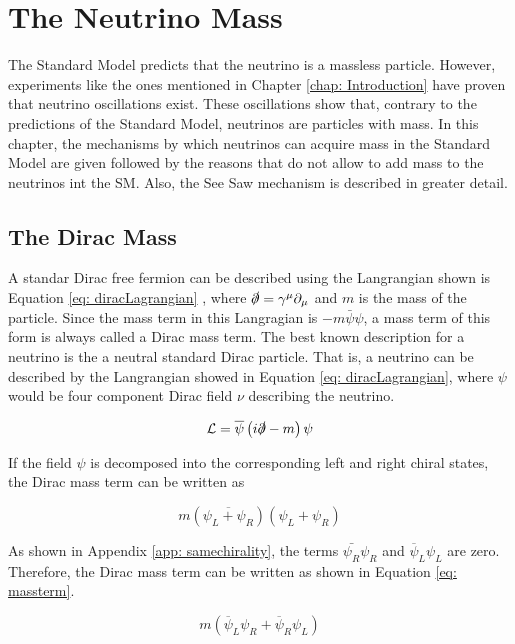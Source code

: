 \chapter{The Neutrino Mass}

The Standard Model predicts that the neutrino is a massless particle. However, experiments like the ones mentioned in Chapter \ref{chap: Introduction} have proven that neutrino oscillations exist. These oscillations show that, contrary to the predictions of the Standard Model, neutrinos are particles with mass. In this chapter, the mechanisms by which neutrinos can acquire mass in the Standard Model are given followed by the reasons that do not allow to add mass to the neutrinos int the SM. Also, the See Saw mechanism is described in greater detail.  

\section{The Dirac Mass}

A standar Dirac free fermion can be described using the Langrangian shown is Equation \ref{eq: diracLagrangian} \cite{NeutrinoMass}, where $\slashed{\partial} = \gamma^{\mu}\partial_{\mu}$ and $m$ is the mass of the particle. Since the mass term in this Langragian is $-m\bar{\psi}\psi$, a mass term of this form is always called a Dirac mass term. The best known description for a neutrino is the a neutral standard Dirac particle. That is, a neutrino can be described by the Langrangian showed in Equation \ref{eq: diracLagrangian}, where $\psi$ would be four component Dirac field $\nu$ describing the neutrino. 

\begin{equation}\label{eq: diracLagrangian}
 \mathcal{L} = \overline{\psi}\left(i\slashed{\partial} - m\right)\psi
\end{equation} 

If the field $\psi$ is decomposed into the corresponding left and right chiral states, the Dirac mass term can be written as 

$$m(\overline{\psi_{L} + \psi_{R}})(\psi_{L} + \psi_{R})$$

As shown in Appendix \ref{app: samechirality}, the terms $\bar{\psi_{R}}\psi_{R}$ and $\overline{\psi}_{L}\psi_{L}$ are zero. Therefore, the Dirac mass term can be written as shown in Equation \ref{eq: massterm}. 

\begin{equation} \label{eq: massterm}
m \left(\overline{\psi}_{L}\psi_{R} + \overline{\psi}_{R}\psi_{L}\right)
\end{equation}



